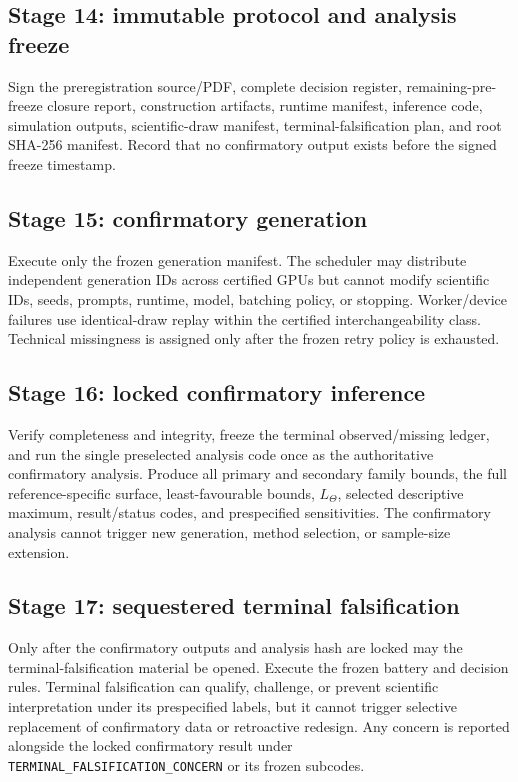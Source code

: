 \documentclass[11pt,a4paper]{article}
\newcommand{\TERMFALSE}{\nolinkurl{TERMINAL_FALSIFICATION_CONCERN}}
\begin{document}
\subsection{Stage 14: immutable protocol and analysis freeze}
Sign the preregistration source/PDF, complete decision register, remaining-pre-freeze closure report, construction artifacts, runtime manifest, inference code, simulation outputs, scientific-draw manifest, terminal-falsification plan, and root SHA-256 manifest. Record that no confirmatory output exists before the signed freeze timestamp.

\subsection{Stage 15: confirmatory generation}
Execute only the frozen generation manifest. The scheduler may distribute independent generation IDs across certified GPUs but cannot modify scientific IDs, seeds, prompts, runtime, model, batching policy, or stopping. Worker/device failures use identical-draw replay within the certified interchangeability class. Technical missingness is assigned only after the frozen retry policy is exhausted.

\subsection{Stage 16: locked confirmatory inference}
Verify completeness and integrity, freeze the terminal observed/missing ledger, and run the single preselected analysis code once as the authoritative confirmatory analysis. Produce all primary and secondary family bounds, the full reference-specific surface, least-favourable bounds, $L_\Theta$, selected descriptive maximum, result/status codes, and prespecified sensitivities. The confirmatory analysis cannot trigger new generation, method selection, or sample-size extension.

\subsection{Stage 17: sequestered terminal falsification}
Only after the confirmatory outputs and analysis hash are locked may the terminal-falsification material be opened. Execute the frozen battery and decision rules. Terminal falsification can qualify, challenge, or prevent scientific interpretation under its prespecified labels, but it cannot trigger selective replacement of confirmatory data or retroactive redesign. Any concern is reported alongside the locked confirmatory result under \TERMFALSE{} or its frozen subcodes.
\end{document}
